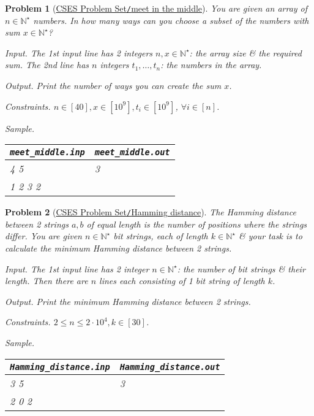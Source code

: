 \documentclass{article}
\newtheorem{problem}{Problem}
\begin{document}
\begin{problem}[\href{https://cses.fi/problemset/task/1628}{CSES Problem Set{\tt/}meet in the middle}]
    You are given an array of $n\in\mathbb{N}^\star$ numbers. In how many ways can you choose a subset of the numbers with sum $x\in\mathbb{N}^\star$?
    \item {\sf Input.} The 1st input line has 2 integers $n,x\in\mathbb{N}^\star$: the array size \& the required sum. The 2nd line has $n$ integers $t_1,\ldots,t_n$: the numbers in the array.
    \item {\sf Output.} Print the number of ways you can create the sum $x$.
    \item {\sf Constraints.} $n\in[40],x\in[10^9],t_i\in[10^9]$, $\forall i\in[n]$.
    \item {\sf Sample.}
    \begin{table}[H]
        \centering
        \begin{tabular}{|l|l|}
            \hline
            \verb|meet_middle.inp| & \verb|meet_middle.out| \\
            \hline
            4 5 & 3 \\
            1 2 3 2 & \\
            \hline
        \end{tabular}
    \end{table}
\end{problem}

\begin{problem}[\href{https://cses.fi/problemset/task/2136}{CSES Problem Set{\tt/}Hamming distance}]
    The Hamming distance between 2 strings $a,b$ of equal length is the number of positions where the strings differ. You are given $n\in\mathbb{N}^\star$ bit strings, each of length $k\in\mathbb{N}^\star$ \& your task is to calculate the minimum Hamming distance between 2 strings.
    \item {\sf Input.} The 1st input line has 2  integer $n\in\mathbb{N}^\star$: the number of bit strings \& their length. Then there are $n$ lines each consisting of 1 bit string of length $k$.
    \item {\sf Output.} Print the minimum Hamming distance between 2 strings.
    \item {\sf Constraints.} $2\le n\le2\cdot10^4,k\in[30]$.
    \item {\sf Sample.}
    \begin{table}[H]
        \centering
        \begin{tabular}{|l|l|}
            \hline
            \verb|Hamming_distance.inp| & \verb|Hamming_distance.out| \\
            \hline
            3 5 & 3 \\
            2 0 2 & \\
            \hline
        \end{tabular}
    \end{table}
\end{problem}
\end{document}
